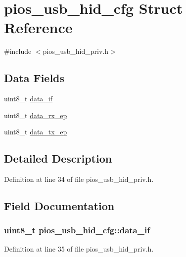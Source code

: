 \hypertarget{structpios__usb__hid__cfg}{\section{pios\-\_\-usb\-\_\-hid\-\_\-cfg \-Struct \-Reference}
\label{structpios__usb__hid__cfg}
}


{\ttfamily \#include $<$pios\-\_\-usb\-\_\-hid\-\_\-priv.\-h$>$}

\subsection*{\-Data \-Fields}
\begin{DoxyCompactItemize}
\item 
uint8\-\_\-t \hyperlink{structpios__usb__hid__cfg_abd31d71097757582b57064851a5c576a}{data\-\_\-if}
\item 
uint8\-\_\-t \hyperlink{structpios__usb__hid__cfg_a9e2b92a09aa1fefba09f5668d00e2ef7}{data\-\_\-rx\-\_\-ep}
\item 
uint8\-\_\-t \hyperlink{structpios__usb__hid__cfg_a700e6e6591adae231e06b05411cb321b}{data\-\_\-tx\-\_\-ep}
\end{DoxyCompactItemize}


\subsection{\-Detailed \-Description}


\-Definition at line 34 of file pios\-\_\-usb\-\_\-hid\-\_\-priv.\-h.



\subsection{\-Field \-Documentation}
\hypertarget{structpios__usb__hid__cfg_abd31d71097757582b57064851a5c576a}{
\subsubsection[{data\-\_\-if}]{\setlength{\rightskip}{0pt plus 5cm}uint8\-\_\-t {\bf pios\-\_\-usb\-\_\-hid\-\_\-cfg\-::data\-\_\-if}}}\label{structpios__usb__hid__cfg_abd31d71097757582b57064851a5c576a}


\-Definition at line 35 of file pios\-\_\-usb\-\_\-hid\-\_\-priv.\-h.

